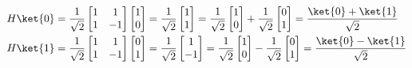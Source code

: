 \documentclass[a4paper]{article}
\begin{document}
\begin{equation}
	\begin{aligned}
		& H \ket{0} = \dfrac{1}{\sqrt{2}}
		\begin{bmatrix}
			1 & 1\\
			1 & -1
		\end{bmatrix}	
		\begin{bmatrix}
			1 \\
			0 
		\end{bmatrix} = 
		\dfrac{1}{\sqrt{2}} 
		\begin{bmatrix}
			1 \\
			1
		\end{bmatrix} = \dfrac{1}{\sqrt{2}}
		\begin{bmatrix}
			1\\
			0
		\end{bmatrix} +  \dfrac{1}{\sqrt{2}}
		\begin{bmatrix}
			0\\
			1
		\end{bmatrix} =
		\dfrac{\ket{0} + \ket{1}}{\sqrt{2}}\\
		& H \ket{1} = \dfrac{1}{\sqrt{2}}
		\begin{bmatrix}
			1 & 1\\
			1 & -1
		\end{bmatrix}	
		\begin{bmatrix}
			0 \\
			1 
		\end{bmatrix} = 
		\dfrac{1}{\sqrt{2}} 
		\begin{bmatrix}
			1 \\
			-1
		\end{bmatrix} = \dfrac{1}{\sqrt{2}}
		\begin{bmatrix}
			1\\
			0
		\end{bmatrix} -  \dfrac{1}{\sqrt{2}}
		\begin{bmatrix}
			0\\
			1
		\end{bmatrix} =
		\dfrac{\ket{0} - \ket{1}}{\sqrt{2}} 
	\end{aligned}	
\end{equation}
\end{document}
